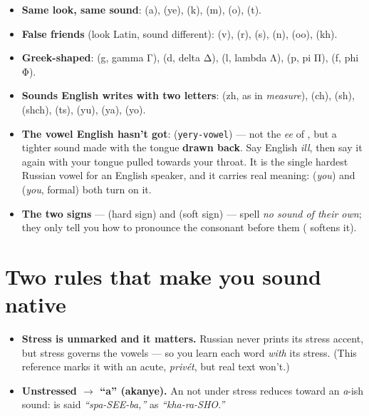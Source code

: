 \begin{itemize}
\raggedright
\setlength{\itemsep}{0.35em}
  \item \textbf{Same look, same sound}: \textbf{} (a), \textbf{} (ye), \textbf{} (k), \textbf{} (m), \textbf{} (o), \textbf{} (t).
  \item \textbf{False friends} (look Latin, sound different): \textbf{} (v), \textbf{} (r), \textbf{} (s), \textbf{} (n), \textbf{} (oo), \textbf{} (kh).
  \item \textbf{Greek-shaped}: \textbf{} (g, gamma Γ), \textbf{} (d, delta Δ), \textbf{} (l, lambda Λ), \textbf{} (p, pi Π), \textbf{} (f, phi Φ).
  \item \textbf{Sounds English writes with two letters}: \textbf{} (zh, as in \emph{measure}), \textbf{} (ch), \textbf{} (sh), \textbf{} (shch), \textbf{} (ts), \textbf{} (yu), \textbf{} (ya), \textbf{} (yo).
  \item \textbf{The vowel English hasn't got}: \textbf{} (\texttt{yery-vowel}) — not the \emph{ee} of \textbf{}, but a tighter sound made with the tongue \textbf{drawn back}. Say English \emph{ill}, then say it again with your tongue pulled towards your throat. It is the single hardest Russian vowel for an English speaker, and it carries real meaning: \textbf{} (\emph{you}) and \textbf{} (\emph{you}, formal) both turn on it.
  \item \textbf{The two signs} — \textbf{} (hard sign) and \textbf{} (soft sign) — spell \emph{no sound of their own}; they only tell you how to pronounce the consonant before them ( softens it).
\end{itemize}

\section*{Two rules that make you sound native}

\begin{itemize}
\raggedright
\setlength{\itemsep}{0.35em}
  \item \textbf{Stress is unmarked and it matters.} Russian never prints its stress accent, but stress governs the vowels — so you learn each word \emph{with} its stress. (This reference marks it with an acute, \emph{privét}, but real text won't.)
  \item \textbf{Unstressed  $\to$ \textquotedblleft{}a\textquotedblright{} (akanye).} An \textbf{} not under stress reduces toward an \emph{a}-ish sound: \emph{} is said \emph{\textquotedblleft{}spa-SEE-ba,\textquotedblright{}} \emph{} as \emph{\textquotedblleft{}kha-ra-SHO.\textquotedblright{}}
\end{itemize}

